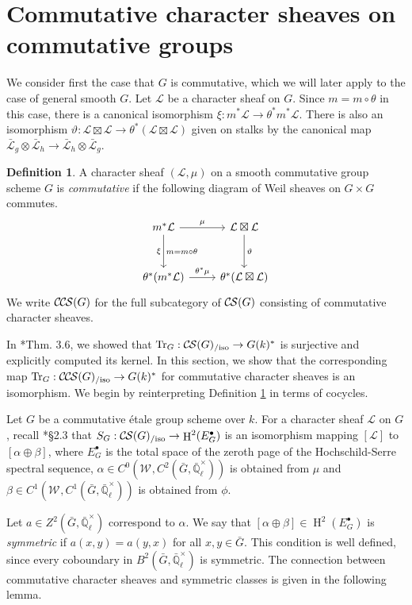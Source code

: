 \documentclass[10pt]{amsart}
\theoremstyle{plain}
\theoremstyle{definition}
\newtheorem{definition}[theorem]{Definition}
\newcommand{\EE}{\mathbb{\bar Q}_\ell}
\newcommand{\EEx}{\EE^\times}
\newcommand{\Weil}[1]{\mathcal{W}_{#1}}
\DeclareMathOperator{\Hh}{H}
\DeclareMathOperator{\Tr}{Tr}
\newcommand{\TrFrob}[1]{\Tr_{#1}}
\newcommand{\cs}[1]{{\mathcal{#1}}}
\newcommand{\gcs}[1]{{\mathcal{\bar #1}}}
\newcommand{\CS}{{\mathcal{C\hskip-0.8pt S}}}
\newcommand{\CCS}{{\mathcal{C\hskip-.8pt C\hskip-0.8pt S}}}
\newcommand{\CSiso}[1]{\CS(#1)_{/\text{iso}}}
\newcommand{\CCSiso}[1]{\CCS(#1)_{/\text{iso}}}
\newcommand{\bG}{\bar{G}}
\begin{document}
\section{Commutative character sheaves on commutative groups}\label{sec:comcom}

We consider first the case that $G$ is commutative, which we will later apply to the case of general smooth $G$.
Let $\cs{L}$ be a character sheaf on $G$.  Since $m = m \circ \theta$ in this case,
there is a canonical isomorphism $\xi : m^* \cs{L} \to \theta^* m^* \cs{L}$.
There is also an isomorphism $\vartheta : \cs{L}\boxtimes\cs{L} \to \theta^*(\cs{L}\boxtimes\cs{L})$
given on stalks by the canonical map $\gcs{L}_{g} \otimes \gcs{L}_{h} \to \gcs{L}_{h} \otimes \gcs{L}_{g}$.

\begin{definition}\label{def:CCScom}
A character sheaf $(\cs{L}, \mu)$ on a smooth commutative group scheme $G$ is \emph{commutative}
if the following diagram of Weil sheaves on $G \times G$ commutes.
  \[
  \begin{tikzcd}[row sep=30]
   m^*\cs{L} \arrow{d}[swap]{\xi}{m= m\circ\theta} \arrow{r}{\mu} & \cs{L}\boxtimes\cs{L} \arrow{d}{\vartheta}\\
   \theta^*(m^*\cs{L}) \arrow{r}{{\theta}^*\mu} &  \theta^*(\cs{L}\boxtimes\cs{L})
  \end{tikzcd}
  \]
We write $\CCS(G)$ for the full subcategory of $\CS(G)$ consisting of commutative character sheaves.
 \end{definition}

In \cite{cunningham-roe:13a}*{Thm. 3.6}, we showed that $\TrFrob{G} : \CSiso{G} \to G(k)^*$ is surjective and
explicitly computed its kernel.  In this section, we show that the corresponding map
$\TrFrob{G} : \CCSiso{G} \to G(k)^*$ for commutative character sheaves is an isomorphism.
We begin by reinterpreting Definition \ref{def:CCScom} in terms of cocycles.

Let $G$ be a commutative \'etale group scheme over $k$. For a character sheaf $\cs{L}$ on $G$, recall
\cite{cunningham-roe:13a}*{\S 2.3} that $S_G : \CSiso{G} \to \Hh^2(E_G^\bullet)$ is an isomorphism mapping
$[\cs{L}]$ to $[\alpha \oplus \beta]$, where $E_G^\bullet$ is the total space of the zeroth page
of the Hochschild-Serre spectral sequence, $\alpha \in C^0(\Weil{}, C^2(\bG, \EEx))$ is obtained from $\mu$ and
$\beta \in C^1(\Weil{}, C^1(\bG, \EEx))$ is obtained from $\phi$.

Let $a \in Z^2(\bG, \EEx)$ correspond to $\alpha$.  We say that $[\alpha \oplus \beta] \in \Hh^2(E_G^\bullet)$
is \emph{symmetric} if $a(x,y) = a(y,x)$ for all $x,y \in \bG$.  This condition is well defined, since every
coboundary in $B^2(\bG, \EEx)$ is symmetric.  The connection between commutative character sheaves
and symmetric classes is given in the following lemma.
\end{document}
